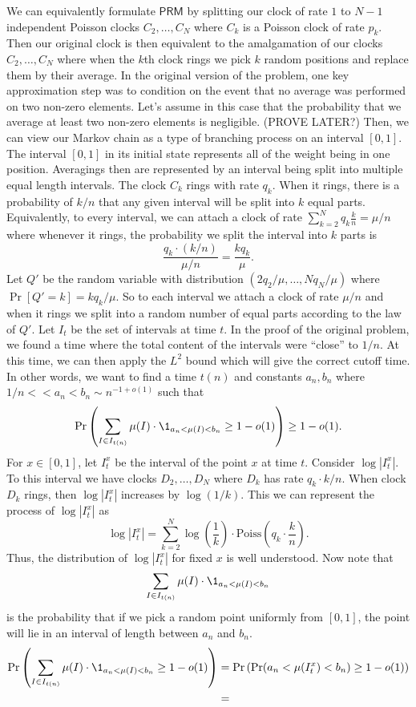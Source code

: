 \documentclass[12pt]{article}
\begin{document}
We can equivalently formulate $\mathsf{PRM}$ by splitting our clock of rate $1$ to $N-1$ independent Poisson clocks $C_2, \ldots, C_N$ where $C_k$ is a Poisson clock of rate $p_k$. Then our original clock is then equivalent to the amalgamation of our clocks $C_2, \ldots, C_N$ where when the $k$th clock rings we pick $k$ random positions and replace them by their average. In the original version of the problem, one key approximation step was to condition on the event that no average was performed on two non-zero elements. Let's assume in this case that the probability that we average at least two non-zero elements is negligible. (PROVE LATER?) Then, we can view our Markov chain as a type of branching process on an interval $[0, 1]$. The interval $[0, 1]$ in its initial state represents all of the weight being in one position. Averagings then are represented by an interval being split into multiple equal length intervals. The clock $C_k$ rings with rate $q_k$. When it rings, there is a probability of $k/n$ that any given interval will be split into $k$ equal parts. Equivalently, to every interval, we can attach a clock of rate $\sum_{k = 2}^N q_k \frac{k}{n} = \mu / n$ where whenever it rings, the probability we split the interval into $k$ parts is 
\[
	\frac{q_k \cdot (k/n)}{\mu /n} = \frac{k q_k}{\mu}.
\]
Let $Q'$ be the random variable with distribution $(2q_2/\mu, \ldots, Nq_N/\mu)$ where $\Pr[Q' = k] = kq_k / \mu$. So to each interval we attach a clock of rate $\mu / n$ and when it rings we split into a random number of equal parts according to the law of $Q'$. Let $I_t$ be the set of intervals at time $t$. In the proof of the original problem, we found a time where the total content of the intervals were ``close'' to $1/n$. At this time, we can then apply the $L^2$ bound which will give the correct cutoff time. In other words, we want to find a time $t(n)$ and constants $a_n, b_n$ where $1/n << a_n < b_n \sim n^{-1 + o(1)}$ such that 
\[
	\Pr \left ( \sum_{I \in I_{t(n)}} \mu(I) \cdot \1_{a_n < \mu(I) < b_n}  \geq 1 - o(1) \right ) \geq 1 - o(1).
\]
For $x \in [0, 1]$, let $I_t^x$ be the interval of the point $x$ at time $t$. Consider $\log |I_t^x|$. To this interval we have clocks $D_2, \ldots, D_N$ where $D_k$ has rate $q_k \cdot k/n$. When clock $D_k$ rings, then $\log |I_t^x|$ increases by $\log (1/k)$. This we can represent the process of $\log |I_t^x|$ as 
\[
	\log |I_t^x| = \sum_{k = 2}^N \log \left ( \frac{1}{k} \right ) \cdot \text{Poiss} \left (q_k \cdot \frac{k}{n}\right ).
\]
Thus, the distribution of $\log |I_t^x|$ for fixed $x$ is well understood. Now note that 
\[
	\sum_{I \in I_{t(n)}} \mu(I) \cdot \1_{a_n < \mu(I) < b_n}
\] 
is the probability that if we pick a random point uniformly from $[0, 1]$, the point will lie in an interval of length between $a_n$ and $b_n$. 
\begin{align*}
	\Pr \left ( \sum_{I \in I_{t(n)}} \mu(I) \cdot \1_{a_n < \mu(I) < b_n}  \geq 1 - o(1) \right ) & = \Pr \left ( \Pr (a_n < \mu (I_t^x) < b_n) \geq 1 - o(1) \right ) \\
	& = 
\end{align*}

\newpage 


\end{document}
